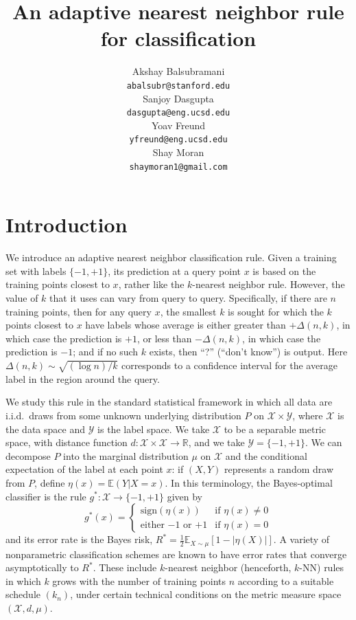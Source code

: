 \documentclass{article}
\title{An adaptive nearest neighbor rule for classification}
\author{
Akshay Balsubramani \\
\texttt{abalsubr@stanford.edu} \\
\And
Sanjoy Dasgupta \\
\texttt{dasgupta@eng.ucsd.edu} \\
\And
Yoav Freund \\
\texttt{yfreund@eng.ucsd.edu} \\
\And
Shay Moran\\
\texttt{shaymoran1@gmail.com} \\
}
\def\R{{\mathbb{R}}}
\def\E{{\mathbb E}}
\def\X{{\mathcal X}}
\def\Y{{\mathcal Y}}
\newcommand{\sign}{\mbox{sign}}
\begin{document}
\maketitle

\section{Introduction}

We introduce an adaptive nearest neighbor classification rule. Given a
training set with labels $\{-1,+1\}$, its prediction at a query point $x$ is based on the training points closest to $x$, rather like
the $k$-nearest neighbor rule. However, the value of $k$ that it uses
can vary from query to query. Specifically, if there are $n$ training
points, then for any query $x$, the smallest $k$ is sought for which
the $k$ points closest to $x$ have labels whose average is either
greater than $+\Delta(n,k)$, in which case the prediction is $+1$, or
less than $- \Delta(n,k)$, in which case the prediction is $-1$; and
if no such $k$ exists, then ``?'' (``don't know'') is output.  Here $\Delta(n,k) \sim \sqrt{(\log n)/k}$ corresponds to a confidence interval for the average label in the region around the query.

We study this rule in the standard statistical framework in which all data are
i.i.d.\ draws from some unknown underlying distribution $P$ on $\X
\times \Y$, where $\X$ is the data space and $\Y$ is the label
space. We take $\X$ to be a separable metric space, with distance
function $d: \X \times \X \rightarrow \R$, and we take $\Y =
\{-1,+1\}$. We can decompose $P$ into the
marginal distribution $\mu$ on $\X$ and the conditional expectation of
the label at each point $x$: if $(X,Y)$ represents a random draw from
$P$, define $\eta(x) = \E(Y| X = x)$. In this terminology, the
Bayes-optimal classifier is the rule $g^*: \X \rightarrow \{-1,+1\}$
given by
\begin{equation}
g^*(x) = 
\left\{
\begin{array}{ll}
\sign(\eta(x)) & \mbox{if $\eta(x) \neq 0$} \\
\mbox{either $-1$ or $+1$} & \mbox{if $\eta(x) = 0$}
\end{array}
\right.
\label{eq:bayes-opt}
\end{equation}
and its error rate is the Bayes risk, $R^* = \frac{1}{2}\E_{X \sim \mu} \left[1-|\eta(X)| \right]$. A variety of nonparametric classification schemes are known to have error rates that converge asymptotically to $R^*$. These include $k$-nearest neighbor (henceforth, $k$-NN) rules~\cite{FH51} in which $k$ grows with the number of training points $n$ according to a suitable schedule $(k_n)$, under certain technical conditions on the metric measure space $(\X, d, \mu)$.
\end{document}
